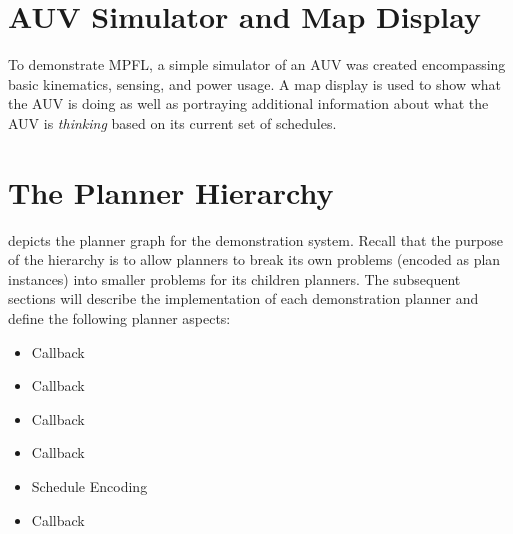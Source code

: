 
\section{AUV Simulator and Map Display}
To demonstrate MPFL, a simple simulator of an AUV was created encompassing basic kinematics, sensing, and power usage. A map display is used to show what the AUV is doing as well as portraying additional information about what the AUV is \textit{thinking} based on its current set of schedules.

\section{The Planner Hierarchy}
 depicts the planner graph for the demonstration system. Recall that the purpose of the hierarchy is to allow planners to break its own problems (encoded as plan instances) into smaller problems for its children planners.  The subsequent sections will describe the implementation of each demonstration planner and define the following planner aspects:
\begin{itemize}
\item Callback 
\item Callback 
\item Callback 
\item Callback 
\item Schedule Encoding
\item Callback 
\end{itemize}

